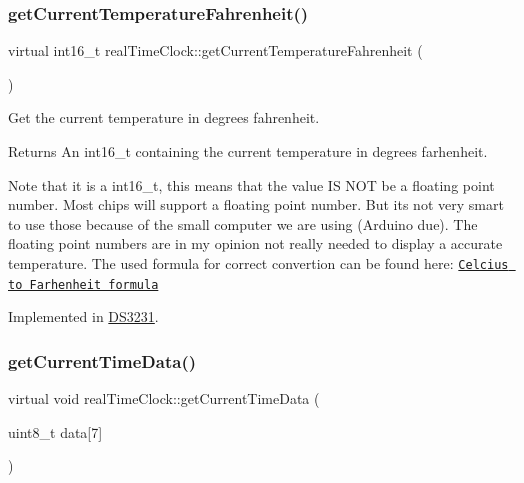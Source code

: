 \subsubsection{\texorpdfstring{get\+Current\+Temperature\+Fahrenheit()}{getCurrentTemperatureFahrenheit()}}
{\footnotesize\ttfamily virtual int16\+\_\+t real\+Time\+Clock\+::get\+Current\+Temperature\+Fahrenheit (\begin{DoxyParamCaption}{ }\end{DoxyParamCaption})\hspace{0.3cm}{\ttfamily [pure virtual]}}



Get the current temperature in degrees fahrenheit. 

\begin{DoxyReturn}{Returns}
An int16\+\_\+t containing the current temperature in degrees farhenheit.
\end{DoxyReturn}
Note that it is a int16\+\_\+t, this means that the value IS N\+OT be a floating point number. Most chips will support a floating point number. But it\textquotesingle{}s not very smart to use those because of the small computer we are using (Arduino due). The floating point numbers are in my opinion not really needed to display a accurate temperature. The used formula for correct convertion can be found here\+: \href{https://www.rapidtables.com/convert/temperature/how-celsius-to-fahrenheit.html}{\tt Celcius to Farhenheit formula} 

Implemented in \mbox{\hyperlink{class_d_s3231_aa31acb133cc63aa7a2a25eda6244c9df}{D\+S3231}}.

\mbox{\label{classreal_time_clock_a2d1613b3cd572f62bc9faaea6a0f82f2}} 
\subsubsection{\texorpdfstring{get\+Current\+Time\+Data()}{getCurrentTimeData()}}
{\footnotesize\ttfamily virtual void real\+Time\+Clock\+::get\+Current\+Time\+Data (\begin{DoxyParamCaption}\item[{uint8\+\_\+t}]{data\mbox{[}7\mbox{]} }\end{DoxyParamCaption})\hspace{0.3cm}{\ttfamily [pure virtual]}}



